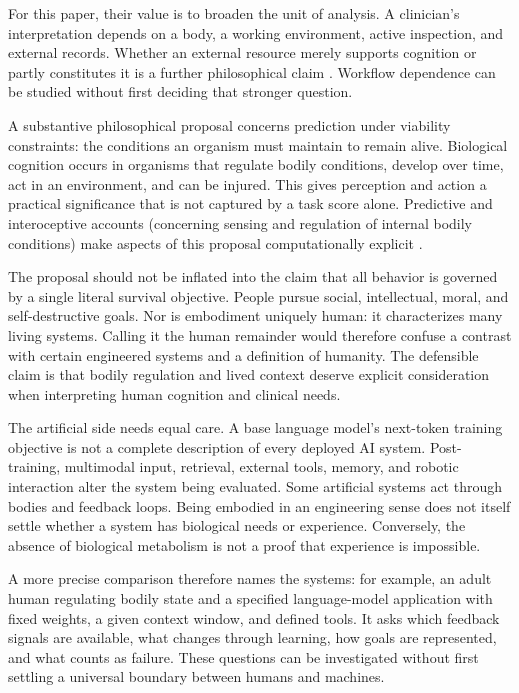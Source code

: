 \documentclass[11pt,a4paper]{article}
\begin{document}
For this paper, their value is to broaden the unit of analysis. A clinician's interpretation depends on a body, a working environment, active inspection, and external records. Whether an external resource merely supports cognition or partly constitutes it is a further philosophical claim \citep{clark1998}. Workflow dependence can be studied without first deciding that stronger question.

A substantive philosophical proposal concerns prediction under viability constraints: the conditions an organism must maintain to remain alive. Biological cognition occurs in organisms that regulate bodily conditions, develop over time, act in an environment, and can be injured. This gives perception and action a practical significance that is not captured by a task score alone. Predictive and interoceptive accounts (concerning sensing and regulation of internal bodily conditions) make aspects of this proposal computationally explicit \citep{friston2010,seth2013}.

The proposal should not be inflated into the claim that all behavior is governed by a single literal survival objective. People pursue social, intellectual, moral, and self-destructive goals. Nor is embodiment uniquely human: it characterizes many living systems. Calling it the human remainder would therefore confuse a contrast with certain engineered systems and a definition of humanity. The defensible claim is that bodily regulation and lived context deserve explicit consideration when interpreting human cognition and clinical needs.

The artificial side needs equal care. A base language model's next-token training objective is not a complete description of every deployed AI system. Post-training, multimodal input, retrieval, external tools, memory, and robotic interaction alter the system being evaluated. Some artificial systems act through bodies and feedback loops. Being embodied in an engineering sense does not itself settle whether a system has biological needs or experience. Conversely, the absence of biological metabolism is not a proof that experience is impossible.

A more precise comparison therefore names the systems: for example, an adult human regulating bodily state and a specified language-model application with fixed weights, a given context window, and defined tools. It asks which feedback signals are available, what changes through learning, how goals are represented, and what counts as failure. These questions can be investigated without first settling a universal boundary between humans and machines.
\end{document}
